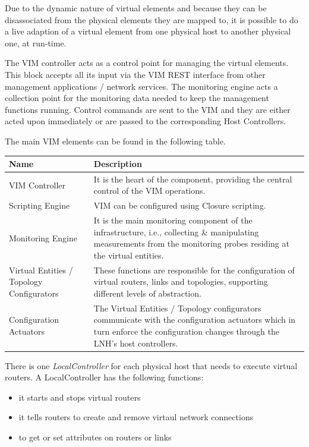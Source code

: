 Due to the dynamic nature of virtual elements and because they can be
disassociated from the physical elements they are mapped to, it is
possible to do a live adaption of a virtual element from one physical
host to another physical one, at run-time.

The VIM controller acts as a control point for managing the virtual
elements. This block accepts all its input via the VIM REST interface
from other management applications / network services. The monitoring
engine acts a collection point for the monitoring data needed to keep
the management functions running. Control commands are sent to
the VIM and they are either acted upon immediately or are passed to
the corresponding Host Controllers.

The main VIM elements can be found in the following table.
\begin{longtable}{ | p{5cm} | p{9cm} | }

\hline
\textbf{Name} & \textbf{Description} \\
\hline
VIM Controller & It is the heart of the component, providing the
central control of the VIM operations. \\
\hline
Scripting Engine & VIM can be configured using Closure
scripting. \\
\hline
Monitoring Engine & It is the main monitoring component of the
infrastructure, i.e., collecting \& manipulating measurements from the
monitoring probes residing at the virtual entities. \\
\hline
Virtual Entities / Topology Configurators & These functions are responsible for the configuration of virtual routers, links and topologies, supporting different levels of abstraction. \\
\hline
Configuration Actuators	& The Virtual Entities / Topology
configurators communicate with the configuration actuators which in
turn enforce the configuration changes through the LNH's host
controllers. \\
\hline
\end{longtable}


There is one \emph{LocalController} for each physical host that needs
to execute virtual routers.  A LocalController has the following
functions:

\begin{itemize}
\item it starts and stops virtual routers
\item it tells routers to create and remove virtaul network
  connections
\item to get or set attributes on routers or links
\end{itemize}

